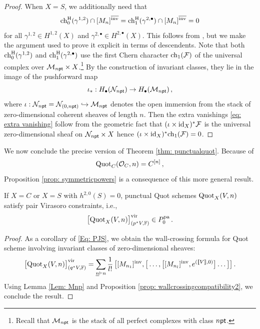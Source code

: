 \documentclass[a4paper, 12pt]{amsart}
\begin{document}
\begin{appendices}
\begin{proof}
When $X=S$, we additionally need that 
\begin{equation}\label{eq: extra vanishing}
    \mathrm{ch}_0^{\mathrm{H}}(\gamma^{1,2})\cap [M_{n}]^{\overline{\mathrm{inv}}} = \mathrm{ch}_1^{\mathrm{H}}(\gamma^{2,\bullet})\cap [M_{n}]^{\overline{\mathrm{inv}}}=0
\end{equation}
for all $\gamma^{1,2}\in H^{1,2}(X)$ and $\gamma^{2,\bullet}\in H^{2,\bullet}(X)$. This follows from \cite[Lemma 4.2]{Bo21.5}, but we make the argument used to prove it explicit in terms of descendents. Note that both $\mathrm{ch}_0^{\mathrm{H}}(\gamma^{1,2})$ and $\mathrm{ch}_1^{\mathrm{H}}(\gamma^{2,\bullet})$ use the first Chern character $\mathrm{ch}_1({\mathcal F})$ of the universal complex over ${\mathcal M}_{n{\mathsf{pt}}}\times X$.\footnote{Recall that ${\mathcal M}_{n{\mathsf{pt}}}$ is the stack of all perfect complexes with class $n{\mathsf{pt}}$.} By the construction of invariant classes, they lie in the image of the pushforward map 
$$\iota_*:H_\bullet(\mathcal{N}_{n{\mathsf{pt}}})\rightarrow H_\bullet({\mathcal M}_{n{\mathsf{pt}}})\,,
$$
where $\iota:\mathcal{N}_{n{\mathsf{pt}}}=\mathcal{N}_{(0,n{\mathsf{pt}})}\hookrightarrow {\mathcal M}_{n{\mathsf{pt}}}$ denotes the open immersion from the stack of zero-dimensional coherent sheaves of length $n$. Then the extra vanishings \eqref{eq: extra vanishing} follow from the geometric fact that $(\iota\times \operatorname{id}_X)^*\mathcal{F}$ is the universal zero-dimensional sheaf on $\mathcal{N}_{n{\mathsf{pt}}}\times X$ hence $(\iota\times \operatorname{id}_X)^*\mathrm{ch}_1(\mathcal{F})=0$. 
\end{proof}
We now conclude the precise version of Theorem \ref{thm: punctualquot}. 
Because of
$$
\text{Quot}_C({\mathcal O}_C,n)=C^{[n]}\,,
$$
Proposition \ref{prop: symmetricpowers} is a consequence of this more general result.
\begin{theorem}
\label{prop: quot}
If $X=C$ or $X=S$ with $h^{2,0}(S)=0$, punctual Quot schemes $\text{Quot}_X(V,n)$ satisfy pair Virasoro constraints, i.e.,
$$\big[\text{Quot}_X(V,n)\big]^{\mathrm{vir}}_{(p^*V,{\mathbb{F}})}\in P_0^{\mathop{\rm pa}\nolimits}\,.
$$
\end{theorem}
\begin{proof}
As a corollary of \eqref{Eq: PJS}, we obtain the wall-crossing formula for Quot scheme involving invariant classes of zero-dimensional sheaves:
$$
    \big[\Quot_X(V,n)\big]^\vir_{(q^*V,\BF)} = \sum_{\begin{subarray}a \underline{n} \vdash n\end{subarray}}\frac{1}{l!}\, \big[[M_{n_1}]^\inva, \big[\ldots, \big[[M_{n_l}]^\inva, e^{(\llbracket V\rrbracket,0)}\big]\ldots\big]\big]\,. 
$$
Using Lemma \ref{Lem: Mnp} and Proposition \ref{prop: wallcrossingcompatibility2}, we conclude the result.
\end{proof}


    \end{appendices}











 
\end{document}
